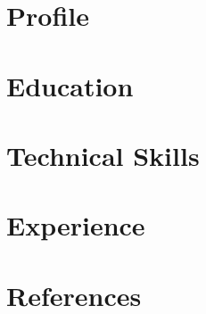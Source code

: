 \documentclass[11pt, a4paper, roman, final]{moderncv}
\begin{document}
\maketitle

\section{Profile}


\section{Education}


\section{Technical Skills}


\section{Experience}


\section{References}


\iffalse

\fi
\end{document}
